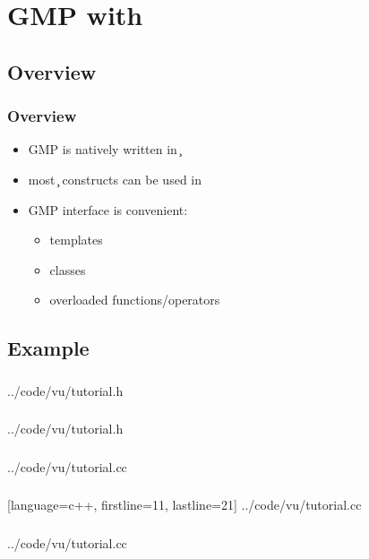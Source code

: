 \section{GMP with \cpp}

\subsection{Overview}

\begin{frame}
\frametitle{Overview}
\begin{itemize}
\item GMP is natively written in \c
\item most \c{} constructs can be used in \cpp
\pause \item GMP \cpp{} interface is convenient:
  \begin{itemize}
  \item templates
  \item classes
  \item overloaded functions/operators
  \end{itemize}
\end{itemize}
\end{frame}

\subsection{Example}

\begin{frame}
\frametitle{}

  {../code/vu/tutorial.h}
\end{frame}
\begin{frame}
\frametitle{}

  {../code/vu/tutorial.h}
\end{frame}

\begin{frame}
\frametitle{}

  {../code/vu/tutorial.cc}
\end{frame}
\begin{frame}
\frametitle{}

  [language=c++, firstline=11, lastline=21]
  {../code/vu/tutorial.cc}
\end{frame}
\begin{frame}
\frametitle{}

  {../code/vu/tutorial.cc}
\end{frame}

